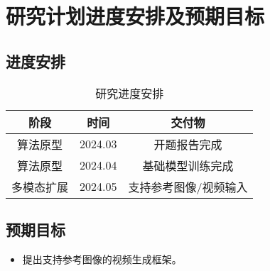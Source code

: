 \section{研究计划进度安排及预期目标}

\subsection{进度安排}
\begin{table}[h]
    \centering
    \begin{tabular}{|c|c|c|}
        \hline
        阶段 & 时间 & 交付物 \\
        \hline
        算法原型 & 2024.03 & 开题报告完成 \\
        \hline
        算法原型 & 2024.04 & 基础模型训练完成 \\
        \hline
        多模态扩展 & 2024.05 & 支持参考图像/视频输入 \\
        \hline
    \end{tabular}
    \caption{研究进度安排}
    \label{tab:schedule}
\end{table}

\subsection{预期目标}
\begin{itemize}
    \item 提出支持参考图像的视频生成框架。
\end{itemize}
